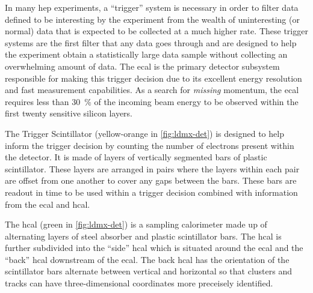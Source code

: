 In many \ac{hep} experiments, a ``trigger'' system is necessary in order to filter data defined to
be interesting by the experiment from the wealth of uninteresting (or normal) data that is expected
to be collected at a much higher rate. These trigger systems are the first filter that any data goes
through and are designed to help the experiment obtain a statistically large data sample without
collecting an overwhelming amount of data. The \ac{ecal} is the primary detector subsystem responsible
for making this trigger decision due to its excellent energy resolution and fast measurement capabilities.
As a search for \emph{missing} momentum, the \ac{ecal} requires less than \qty{30}{\percent} of the incoming
beam energy to be observed within the first twenty sensitive silicon layers.

The Trigger Scintillator (yellow-orange in \cref{fig:ldmx-det}) is designed to help inform the trigger
decision by counting the number of electrons present within the detector. It is made of layers of vertically
segmented bars of plastic scintillator. These layers are arranged in pairs where the layers within
each pair are offset from one another to cover any gaps between the bars. These bars are readout in
time to be used within a trigger decision combined with information from the \ac{ecal} and \ac{hcal}.

The \ac{hcal} (green in \cref{fig:ldmx-det}) is a sampling calorimeter made up of alternating
layers of steel absorber and plastic scintillator bars. The \ac{hcal} is further subdivided into
the ``side'' \ac{hcal} which is situated around the \ac{ecal} and the ``back'' \ac{hcal}
downstream of the \ac{ecal}. The back \ac{hcal} has the orientation of the scintillator bars
alternate between vertical and horizontal so that clusters and tracks can have three-dimensional
coordinates more preceisely identified.

